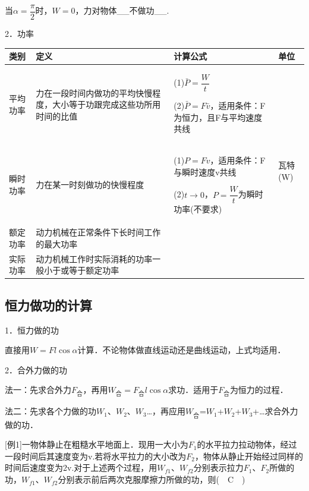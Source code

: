 \documentclass[cn,10.5pt,chinese,mac,chinesefont=founder]{elegantbook}
\begin{document}
当$\alpha=\dfrac{\pi}{2}$时，$W=0$，力对物体\_\_不做功\_\_.

2．功率

\begin{longtable}[]{@{}m{1.6cm}m{5cm}m{6cm}m{1cm}@{}}
\toprule
类别 & 定义 & 计算公式 & 单位\tabularnewline
\midrule
\endhead

平均功率&
力在一段时间内做功的平均快慢程度，大小等于功跟完成这些功所用时间的比值
& 
(1)$\bar{P}=\dfrac{W}{t}$

(2)$\bar{P}=F \bar{v}$，适用条件：F为恒力，且F与平均速度共线
&\multirow{4}{1cm}{瓦特(W)}
\tabularnewline
瞬时功率&
力在某一时刻做功的快慢程度
& \begin{minipage}[t]{0.4\columnwidth}\raggedright
(1)$P=Fv$，适用条件：F与瞬时速度v共线

(2)$t\rightarrow 0$，$P=\dfrac{W}{t}$为瞬时功率(不要求)\strut
\end{minipage} & \begin{minipage}[t]{0.22\columnwidth}\raggedright
\strut
\end{minipage}\tabularnewline

额定功率 & 
\begin{minipage}[t]{0.8\columnwidth}\raggedright
动力机械在正常条件下长时间工作的最大功率
\end{minipage} &
&\tabularnewline
实际功率 & 
\begin{minipage}[t]{0.8\columnwidth}\raggedright
动力机械工作时实际消耗的功率一般小于或等于额定功率
\end{minipage}
 &
&\tabularnewline
\bottomrule
\end{longtable}

\newpage
\subsection{恒力做功的计算}

1．恒力做的功

直接用$W=Fl\cos \alpha$计算．不论物体做直线运动还是曲线运动，上式均适用．

2．合外力做的功

法一：先求合外力$F_{\text{合}}$，再用$W_{\text{合}}=F_{\text{合}}l\cos \alpha$求功．适用于$F_{\text{合}}$为恒力的过程．

法二：先求各个力做的功$W_1$、$W_2$、$W_3$\ldots，再应用$W_{\text{合}}$=$W_1$+$W_2$+$W_3$+\ldots 求合外力做的功．

{[}例1{]}一物体静止在粗糙水平地面上．现用一大小为$F_1$的水平拉力拉动物体，经过一段时间后其速度变为v.若将水平拉力的大小改为$F_2$，物体从静止开始经过同样的时间后速度变为2v.对于上述两个过程，用$W_{f1}$、$W_{f2}$分别表示拉力$F_1$、$F_2$所做的功，$W_{f1}$、$W_{f2}$分别表示前后两次克服摩擦力所做的功，则(　C　)
\end{document}

